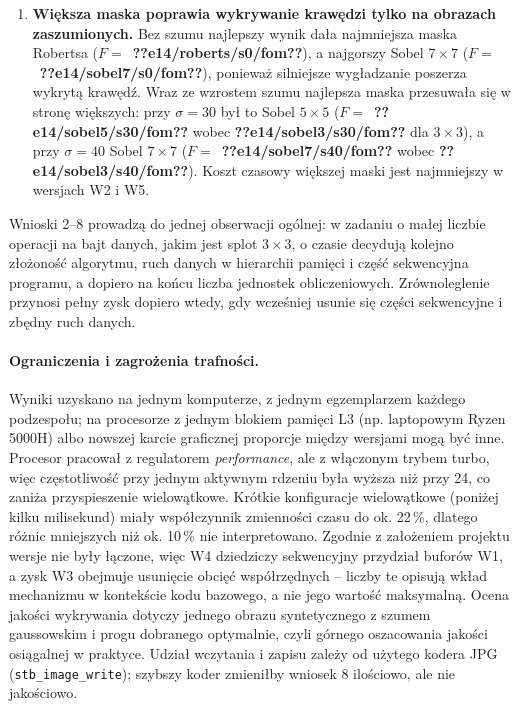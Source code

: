 \documentclass[12pt,a4paper]{article}
\providecommand{\wynik}[1]{\textbf{??#1??}}
\newcommand{\kod}[1]{\texttt{#1}}
\begin{document}
\begin{enumerate}
	\item \textbf{Większa maska poprawia wykrywanie krawędzi tylko na obrazach zaszumionych.} Bez szumu najlepszy wynik dała najmniejsza maska Robertsa ($F =$~\wynik{e14/roberts/s0/fom}), a najgorszy Sobel $7\times7$ ($F =$~\wynik{e14/sobel7/s0/fom}), ponieważ silniejsze wygładzanie poszerza wykrytą krawędź. Wraz ze wzrostem szumu najlepsza maska przesuwała się w stronę większych: przy $\sigma = 30$ był to Sobel $5\times5$ ($F =$~\wynik{e14/sobel5/s30/fom} wobec \wynik{e14/sobel3/s30/fom} dla $3\times3$), a przy $\sigma = 40$ Sobel $7\times7$ ($F =$~\wynik{e14/sobel7/s40/fom} wobec \wynik{e14/sobel3/s40/fom}). Koszt czasowy większej maski jest najmniejszy w wersjach W2 i W5.
\end{enumerate}

Wnioski 2--8 prowadzą do jednej obserwacji ogólnej: w zadaniu o małej liczbie operacji na bajt danych, jakim jest splot $3\times3$, o czasie decydują kolejno złożoność algorytmu, ruch danych w hierarchii pamięci i część sekwencyjna programu, a dopiero na końcu liczba jednostek obliczeniowych. Zrównoleglenie przynosi pełny zysk dopiero wtedy, gdy wcześniej usunie się części sekwencyjne i zbędny ruch danych.

\paragraph{Ograniczenia i zagrożenia trafności.} Wyniki uzyskano na jednym komputerze, z jednym egzemplarzem każdego podzespołu; na procesorze z jednym blokiem pamięci L3 (np. laptopowym Ryzen 5000H) albo nowszej karcie graficznej proporcje między wersjami mogą być inne. Procesor pracował z regulatorem \emph{performance}, ale z włączonym trybem turbo, więc częstotliwość przy jednym aktywnym rdzeniu była wyższa niż przy 24, co zaniża przyspieszenie wielowątkowe. Krótkie konfiguracje wielowątkowe (poniżej kilku milisekund) miały współczynnik zmienności czasu do ok. 22\,\%, dlatego różnic mniejszych niż ok. 10\,\% nie interpretowano. Zgodnie z założeniem projektu wersje nie były łączone, więc W4 dziedziczy sekwencyjny przydział buforów W1, a zysk W3 obejmuje usunięcie obcięć współrzędnych -- liczby te opisują wkład mechanizmu w kontekście kodu bazowego, a nie jego wartość maksymalną. Ocena jakości wykrywania dotyczy jednego obrazu syntetycznego z szumem gaussowskim i progu dobranego optymalnie, czyli górnego oszacowania jakości osiągalnej w praktyce. Udział wczytania i zapisu zależy od użytego kodera JPG (\kod{stb\_image\_write}); szybszy koder zmieniłby wniosek 8 ilościowo, ale nie jakościowo.
\end{document}
